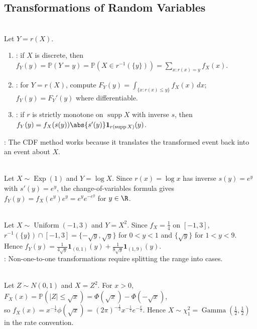 \subsection{Transformations of Random Variables}
\begin{method} \label{meth:one-variable-transformation-cdf-method} \\
Let $Y=r(X)$.
\begin{enumerate}[label=(\roman*)]
\setlength{\itemsep}{0pt}
\item {}: if $X$ is discrete, then $f_Y(y)=\mathbb{P}(Y=y)=\mathbb{P}(X\in r^{-1}(\{y\}))=\sum\limits_{x:r(x)=y}f_X(x)$.
\item {}: for $Y=r(X)$, compute $F_Y(y)=\int_{\{x:r(x)\leq y\}}f_X(x)\,dx$; $f_Y(y)=F_Y'(y)$ where differentiable.
\item {}: if $r$ is strictly monotone on $\operatorname{supp}X$ with inverse $s$, then $f_Y(y)=f_X(s(y))\abs{s'(y)}\mathbf{1}_{r(\operatorname{supp}X)}(y)$.
\end{enumerate}
: The CDF method works because it translates the transformed event back into an event about $X$.
\end{method}

\begin{example} \label{ex:log-transform-exponential} \\
Let $X\sim\operatorname{Exp}(1)$ and $Y=\log X$. Since $r(x)=\log x$ has inverse $s(y)=e^y$ with $s'(y)=e^y$, the change-of-variables formula gives $f_Y(y)=f_X(e^y)e^y=e^ye^{-e^y}$ for $y\in\R$.
\end{example}

\begin{example} \label{ex:square-transform-nonmonotone-uniform} \\
Let $X\sim\operatorname{Uniform}(-1,3)$ and $Y=X^2$. Since $f_X=\frac{1}{4}$ on $[-1,3]$, $r^{-1}(\{y\})\cap[-1,3]=\{-\sqrt y,\sqrt y\}$ for $0<y<1$ and $\{\sqrt y\}$ for $1<y<9$. Hence $f_Y(y)=\frac{1}{4\sqrt y}\mathbf{1}_{(0,1)}(y)+\frac{1}{8\sqrt y}\mathbf{1}_{(1,9)}(y)$.\\
: Non-one-to-one transformations require splitting the range into cases.
\end{example}

\begin{example} \label{ex:standard-normal-square-chi-square} \\
Let $Z\sim N(0,1)$ and $X=Z^2$. For $x>0$, $F_X(x)=\mathbb{P}(|Z|\leq\sqrt{x})=\Phi(\sqrt{x})-\Phi(-\sqrt{x})$,\\
so $f_X(x)=x^{-\frac{1}{2}}\phi(\sqrt{x})=(2\pi)^{-\frac{1}{2}}x^{-\frac{1}{2}}e^{-\frac{x}{2}}$. Hence $X\sim\chi_1^2=\operatorname{Gamma}(\frac{1}{2},\frac{1}{2})$ in the rate convention.
\end{example}

